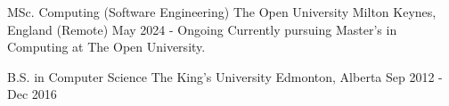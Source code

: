 
\begin{cventries}
  \cventry
    {MSc. Computing (Software Engineering)} %
    {The Open University} %
    {Milton Keynes, England (Remote)} %
    {May 2024 - Ongoing} %
    {Currently pursuing Master's in Computing at The Open University.}

  \cventry
    {B.S. in Computer Science} %
    {The King's University} %
    {Edmonton, Alberta} %
    {Sep 2012 - Dec 2016} %
    {}
\end{cventries}